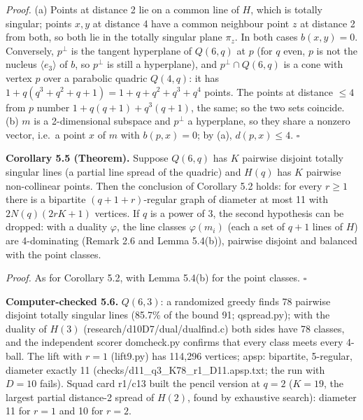 \documentclass[
  10pt,
]{article}
\begin{document}
\emph{Proof.} (a) Points at distance 2 lie on a common line of \(H\),
which is totally singular; points \(x, y\) at distance 4 have a common
neighbour point \(z\) at distance 2 from both, so both lie in the
totally singular plane \(\pi_z\). In both cases \(b(x,y) = 0\).
Conversely, \(p^\perp\) is the tangent hyperplane of \(Q(6,q)\) at \(p\)
(for \(q\) even, \(p\) is not the nucleus \(\langle e_3\rangle\) of
\(b\), so \(p^\perp\) is still a hyperplane), and \(p^\perp\cap Q(6,q)\)
is a cone with vertex \(p\) over a parabolic quadric \(Q(4,q)\): it has
\(1+q(q^3+q^2+q+1) = 1+q+q^2+q^3+q^4\) points. The points at distance
\(\le 4\) from \(p\) number \(1+q(q+1)+q^3(q+1)\), the same; so the two
sets coincide. (b) \(m\) is a 2-dimensional subspace and \(p^\perp\) a
hyperplane, so they share a nonzero vector, i.e.~a point \(x\) of \(m\)
with \(b(p,x)=0\); by (a), \(d(p,x)\le 4\). \(\square\)

\textbf{Corollary 5.5 (Theorem).} Suppose \(Q(6,q)\) has \(K\) pairwise
disjoint totally singular lines (a partial line spread of the quadric)
and \(H(q)\) has \(K\) pairwise non-collinear points. Then the
conclusion of Corollary 5.2 holds: for every \(r\ge 1\) there is a
bipartite \((q+1+r)\)-regular graph of diameter at most 11 with
\(2N(q)(2rK+1)\) vertices. If \(q\) is a power of 3, the second
hypothesis can be dropped: with a duality \(\varphi\), the line classes
\(\varphi(m_i)\) (each a set of \(q+1\) lines of \(H\)) are 4-dominating
(Remark 2.6 and Lemma 5.4(b)), pairwise disjoint and balanced with the
point classes.

\emph{Proof.} As for Corollary 5.2, with Lemma 5.4(b) for the point
classes. \(\square\)

\textbf{Computer-checked 5.6.} \(Q(6,3)\): a randomized greedy finds 78
pairwise disjoint totally singular lines (85.7\% of the bound 91;
qspread.py); with the duality of \(H(3)\)
(research/d10D7/dual/dualfind.c) both sides have 78 classes, and the
independent scorer domcheck.py confirms that every class meets every
4-ball. The lift with \(r = 1\) (lift9.py) has 114,296 vertices; apsp:
bipartite, 5-regular, diameter exactly 11
(checks/d11\_q3\_K78\_r1\_D11.apsp.txt; the run with \(D = 10\) fails).
Squad card r1/c13 built the pencil version at \(q = 2\) (\(K = 19\), the
largest partial distance-2 spread of \(H(2)\), found by exhaustive
search): diameter 11 for \(r = 1\) and 10 for \(r = 2\).
\end{document}
